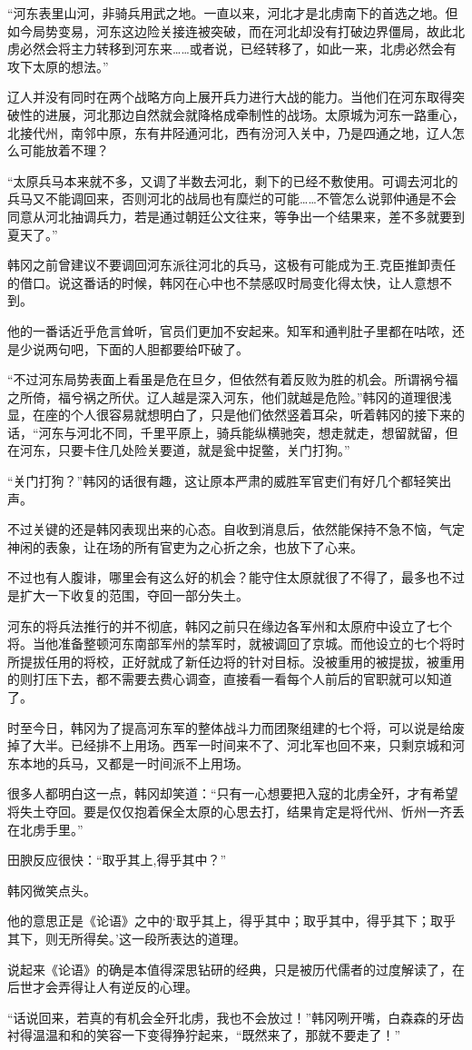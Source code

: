 “河东表里山河，非骑兵用武之地。一直以来，河北才是北虏南下的首选之地。但如今局势变易，河东这边险关接连被突破，而在河北却没有打破边界僵局，故此北虏必然会将主力转移到河东来……或者说，已经转移了，如此一来，北虏必然会有攻下太原的想法。”

辽人并没有同时在两个战略方向上展开兵力进行大战的能力。当他们在河东取得突破性的进展，河北那边自然就会就降格成牵制性的战场。太原城为河东一路重心，北接代州，南邻中原，东有井陉通河北，西有汾河入关中，乃是四通之地，辽人怎么可能放着不理？

“太原兵马本来就不多，又调了半数去河北，剩下的已经不敷使用。可调去河北的兵马又不能调回来，否则河北的战局也有糜烂的可能……不管怎么说郭仲通是不会同意从河北抽调兵力，若是通过朝廷公文往来，等争出一个结果来，差不多就要到夏天了。”

韩冈之前曾建议不要调回河东派往河北的兵马，这极有可能成为王.克臣推卸责任的借口。说这番话的时候，韩冈在心中也不禁感叹时局变化得太快，让人意想不到。

他的一番话近乎危言耸听，官员们更加不安起来。知军和通判肚子里都在咕哝，还是少说两句吧，下面的人胆都要给吓破了。

“不过河东局势表面上看虽是危在旦夕，但依然有着反败为胜的机会。所谓祸兮福之所倚，福兮祸之所伏。辽人越是深入河东，他们就越是危险。”韩冈的道理很浅显，在座的个人很容易就想明白了，只是他们依然竖着耳朵，听着韩冈的接下来的话，“河东与河北不同，千里平原上，骑兵能纵横驰突，想走就走，想留就留，但在河东，只要卡住几处险关要道，就是瓮中捉鳖，关门打狗。”

“关门打狗？”韩冈的话很有趣，这让原本严肃的威胜军官吏们有好几个都轻笑出声。

不过关键的还是韩冈表现出来的心态。自收到消息后，依然能保持不急不恼，气定神闲的表象，让在场的所有官吏为之心折之余，也放下了心来。

不过也有人腹诽，哪里会有这么好的机会？能守住太原就很了不得了，最多也不过是扩大一下收复的范围，夺回一部分失土。

河东的将兵法推行的并不彻底，韩冈之前只在缘边各军州和太原府中设立了七个将。当他准备整顿河东南部军州的禁军时，就被调回了京城。而他设立的七个将时所提拔任用的将校，正好就成了新任边将的针对目标。没被重用的被提拔，被重用的则打压下去，都不需要去费心调查，直接看一看每个人前后的官职就可以知道了。

时至今日，韩冈为了提高河东军的整体战斗力而团聚组建的七个将，可以说是给废掉了大半。已经排不上用场。西军一时间来不了、河北军也回不来，只剩京城和河东本地的兵马，又都是一时间派不上用场。

很多人都明白这一点，韩冈却笑道：“只有一心想要把入寇的北虏全歼，才有希望将失土夺回。要是仅仅抱着保全太原的心思去打，结果肯定是将代州、忻州一齐丢在北虏手里。”

田腴反应很快：“取乎其上,得乎其中？”

韩冈微笑点头。

他的意思正是《论语》之中的‘取乎其上，得乎其中；取乎其中，得乎其下；取乎其下，则无所得矣。’这一段所表达的道理。

说起来《论语》的确是本值得深思钻研的经典，只是被历代儒者的过度解读了，在后世才会弄得让人有逆反的心理。

“话说回来，若真的有机会全歼北虏，我也不会放过！”韩冈咧开嘴，白森森的牙齿衬得温温和和的笑容一下变得狰狞起来，“既然来了，那就不要走了！”
